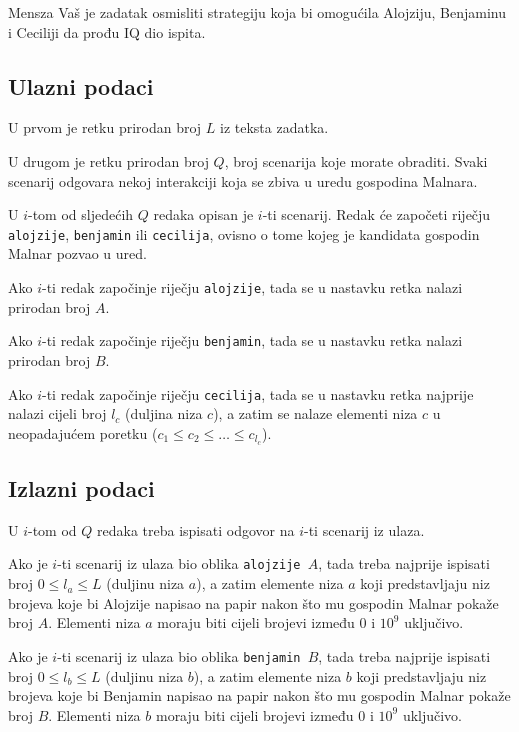 \begin{statement}[
  problempoints=100,
  timelimit=1 sekunda,
  memorylimit=512 MiB,
]{Mensza}
Vaš je zadatak osmisliti strategiju koja bi omogućila Alojziju, Benjaminu i
Ceciliji da prođu IQ dio ispita.

\subsection*{Ulazni podaci}
U prvom je retku prirodan broj $L$ iz teksta zadatka.

U drugom je retku prirodan broj $Q$, broj scenarija koje morate obraditi. Svaki
scenarij odgovara nekoj interakciji koja se zbiva u uredu gospodina Malnara.

U $i$-tom od sljedećih $Q$ redaka opisan je $i$-ti scenarij. Redak će započeti
riječju \texttt{alojzije}, \texttt{benjamin} ili \texttt{cecilija}, ovisno o
tome kojeg je kandidata gospodin Malnar pozvao u ured.

Ako $i$-ti redak započinje riječju \texttt{alojzije}, tada se u nastavku retka
nalazi prirodan broj $A$.

Ako $i$-ti redak započinje riječju \texttt{benjamin}, tada se u nastavku retka
nalazi prirodan broj $B$.

Ako $i$-ti redak započinje riječju \texttt{cecilija}, tada se u nastavku retka
najprije nalazi cijeli broj $l_c$ (duljina niza $c$), a zatim se nalaze
elementi niza $c$ u neopadajućem poretku ($c_1 \le c_2 \le \ldots \le c_{l_c}$).

\subsection*{Izlazni podaci}
U $i$-tom od $Q$ redaka treba ispisati odgovor na $i$-ti scenarij iz ulaza.

Ako je $i$-ti scenarij iz ulaza bio oblika \texttt{alojzije $A$}, tada treba
najprije ispisati broj $0 \le l_a \le L$ (duljinu niza $a$), a zatim elemente niza
$a$ koji predstavljaju niz brojeva koje bi Alojzije napisao na papir nakon što
mu gospodin Malnar pokaže broj $A$. Elementi niza $a$ moraju biti cijeli brojevi
između $0$ i $10^9$ uključivo.

Ako je $i$-ti scenarij iz ulaza bio oblika \texttt{benjamin $B$}, tada treba
najprije ispisati broj $0 \le l_b \le L$ (duljinu niza $b$), a zatim elemente niza $b$ koji
predstavljaju niz brojeva koje bi Benjamin napisao na papir nakon što mu gospodin
Malnar pokaže broj $B$. Elementi niza $b$ moraju biti cijeli brojevi između $0$ 
i $10^9$ uključivo.


\end{statement}
